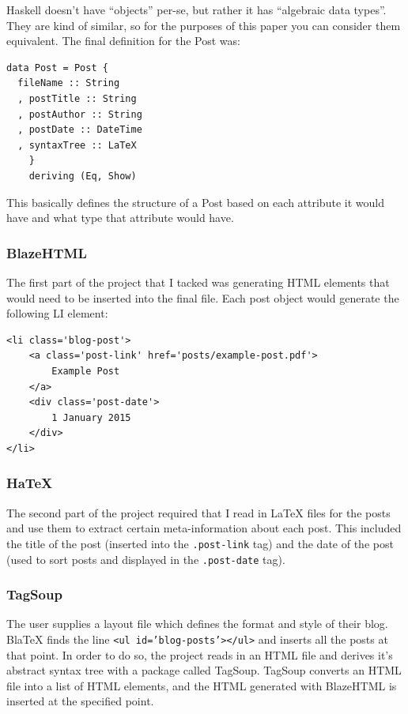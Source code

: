\documentclass[doc,apacite,12pt]{apa6}
\begin{document}
Haskell doesn't have ``objects'' per-se, but rather it has ``algebraic data types''. They are kind of similar, so for the purposes of this paper you can consider them equivalent. The final definition for the Post was:

\begin{verbatim}
data Post = Post {
  fileName :: String
  , postTitle :: String
  , postAuthor :: String
  , postDate :: DateTime
  , syntaxTree :: LaTeX
    }
    deriving (Eq, Show)
\end{verbatim}

This basically defines the structure of a Post based on each attribute it would have and what type that attribute would have. 

\subsubsection{BlazeHTML}
The first part of the project that I tacked was generating HTML elements that would need to be inserted into the final file. Each post object would generate the following LI element:

\begin{verbatim}
<li class='blog-post'>
    <a class='post-link' href='posts/example-post.pdf'>
        Example Post
    </a>
    <div class='post-date'>
        1 January 2015
    </div>
</li>
\end{verbatim}

\subsubsection{HaTeX}
The second part of the project required that I read in LaTeX files for the posts and use them to extract certain meta-information about each post. This included the title of the post (inserted into the \texttt{.post-link} tag) and the date of the post (used to sort posts and displayed in the \texttt{.post-date} tag). 

\subsubsection{TagSoup}

The user supplies a layout file which defines the format and style of their blog. BlaTeX finds the line \texttt{<ul id='blog-posts'></ul>} and inserts all the posts at that point. In order to do so, the project reads in an HTML file and derives it's abstract syntax tree with a package called TagSoup. TagSoup converts an HTML file into a list of HTML elements, and the HTML generated with BlazeHTML is inserted at the specified point. 
\end{document}
